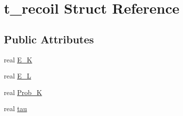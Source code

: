 \hypertarget{structt__recoil}{\section{t\-\_\-recoil \-Struct \-Reference}
\label{structt__recoil}
}
\subsection*{\-Public \-Attributes}
\begin{DoxyCompactItemize}
\item 
real \hyperlink{structt__recoil_adf6683000d97093f67fa9c6909e65c91}{\-E\-\_\-\-K}
\item 
real \hyperlink{structt__recoil_a9e248ac215b3793cd10935b635bd399b}{\-E\-\_\-\-L}
\item 
real \hyperlink{structt__recoil_a59b9ac6b5910e522f3950fc1100c59fb}{\-Prob\-\_\-\-K}
\item 
real \hyperlink{structt__recoil_a3333b8572f8af2c07b2e144a7b07d724}{tau}
\end{DoxyCompactItemize}


